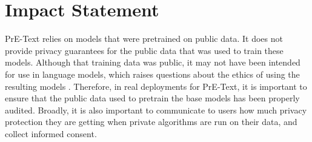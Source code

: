 \section*{Impact Statement}
PrE-Text relies on models that were pretrained on public data. It does not provide privacy guarantees for the public data that was used to train these models.
Although that training data was public, it may not have been intended for use in language models, which raises questions about the ethics of using the resulting models \citep{tramer2022considerations}. 
Therefore, in real deployments for PrE-Text, it is important to ensure that the public data used to pretrain the base models has been properly audited. Broadly, it is also important to communicate to users how much privacy protection they are getting when private algorithms are run on their data, and collect informed consent. 
